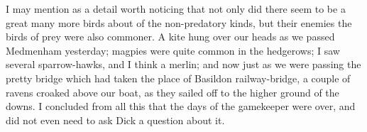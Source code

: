 I may mention as a detail worth noticing that not only did there seem to
be a great many more birds about of the non-predatory kinds, but their
enemies the birds of prey were also commoner. A kite hung over our heads
as we passed Medmenham yesterday; magpies were quite common in the
hedgerows; I saw several sparrow-hawks, and I think a merlin; and now
just as we were passing the pretty bridge which had taken the place of
Basildon railway-bridge, a couple of ravens croaked above our boat, as
they sailed off to the higher ground of the downs. I concluded from all
this that the days of the gamekeeper were over, and did not even need to
ask Dick a question about it.
